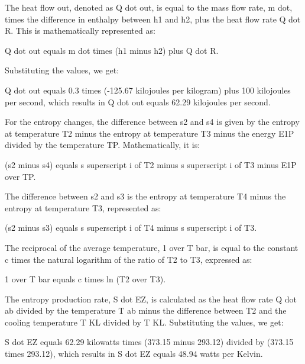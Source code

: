 The heat flow out, denoted as Q dot out, is equal to the mass flow rate, m dot, times the difference in enthalpy between h1 and h2, plus the heat flow rate Q dot R. This is mathematically represented as:

Q dot out equals m dot times (h1 minus h2) plus Q dot R.

Substituting the values, we get:

Q dot out equals 0.3 times (-125.67 kilojoules per kilogram) plus 100 kilojoules per second, which results in Q dot out equals 62.29 kilojoules per second.

For the entropy changes, the difference between s2 and s4 is given by the entropy at temperature T2 minus the entropy at temperature T3 minus the energy E1P divided by the temperature TP. Mathematically, it is:

(s2 minus s4) equals s superscript i of T2 minus s superscript i of T3 minus E1P over TP.

The difference between s2 and s3 is the entropy at temperature T4 minus the entropy at temperature T3, represented as:

(s2 minus s3) equals s superscript i of T4 minus s superscript i of T3.

The reciprocal of the average temperature, 1 over T bar, is equal to the constant c times the natural logarithm of the ratio of T2 to T3, expressed as:

1 over T bar equals c times ln (T2 over T3).

The entropy production rate, S dot EZ, is calculated as the heat flow rate Q dot ab divided by the temperature T ab minus the difference between T2 and the cooling temperature T KL divided by T KL. Substituting the values, we get:

S dot EZ equals 62.29 kilowatts times (373.15 minus 293.12) divided by (373.15 times 293.12), which results in S dot EZ equals 48.94 watts per Kelvin.